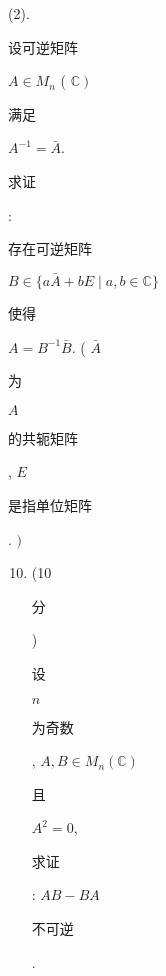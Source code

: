 \documentclass[10pt]{article}
\begin{document}
(2). \begin{CJK}{UTF8}{mj}设可逆矩阵\end{CJK} $A \in M_{n}$ ( $\left.\mathbb{C}\right)$ \begin{CJK}{UTF8}{mj}满足\end{CJK} $A^{-1}=\bar{A}$. \begin{CJK}{UTF8}{mj}求证\end{CJK}: \begin{CJK}{UTF8}{mj}存在可逆矩阵\end{CJK} $B \in\{a \bar{A}+b E \mid a, b \in \mathbb{C}\}$ \begin{CJK}{UTF8}{mj}使得\end{CJK} $A=B^{-1} \bar{B}$. ( $\bar{A}$ \begin{CJK}{UTF8}{mj}为\end{CJK} $A$ \begin{CJK}{UTF8}{mj}的共轭矩阵\end{CJK}, $E$ \begin{CJK}{UTF8}{mj}是指单位矩阵\end{CJK}. $)$

\begin{enumerate}
  \setcounter{enumi}{9}
  \item (10 \begin{CJK}{UTF8}{mj}分\end{CJK}) \begin{CJK}{UTF8}{mj}设\end{CJK} $n$ \begin{CJK}{UTF8}{mj}为奇数\end{CJK}, $A, B \in M_{n}(\mathbb{C})$ \begin{CJK}{UTF8}{mj}且\end{CJK} $A^{2}=0$, \begin{CJK}{UTF8}{mj}求证\end{CJK}: $A B-B A$ \begin{CJK}{UTF8}{mj}不可逆\end{CJK}.
\end{enumerate}
\end{document}
